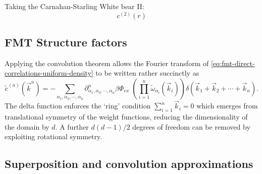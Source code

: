 Taking the Carnahan-Starling White bear II:
\begin{equation}
  c^{(2)}(r)
\end{equation}

\subsection{FMT Structure factors}

Applying the convolution theorem allows the Fourier transform of \eqref{eq:fmt-direct-correlations-uniform-density} to be written rather succinctly as
\begin{equation}
  \tilde{c}^{(n)}(\vec{k}^n) =
  - \sum_{\alpha_1, \alpha_2, \cdots, \alpha_n}
  \partial^n_{\alpha_1, \alpha_2, \cdots, \alpha_n} \beta\Phi_{ex} \;
  \left( \prod_{i=1}^n \widetilde{\omega}_{\alpha_i}(\vec{k}_i) \right)
  \delta(\vec{k}_1 + \vec{k}_2 + \cdots + \vec{k}_n).
\end{equation}
The delta function enforces the `ring' condition $\sum_{i=1}^n \vec{k}_i = 0$ which emerges from translational symmetry of the weight functions, reducing the dimensionality of the domain by $d$.
A further $d(d-1)/2$ degrees of freedom%
can be removed by exploiting rotational symmetry.



\subsection{Superposition and convolution approximations}

